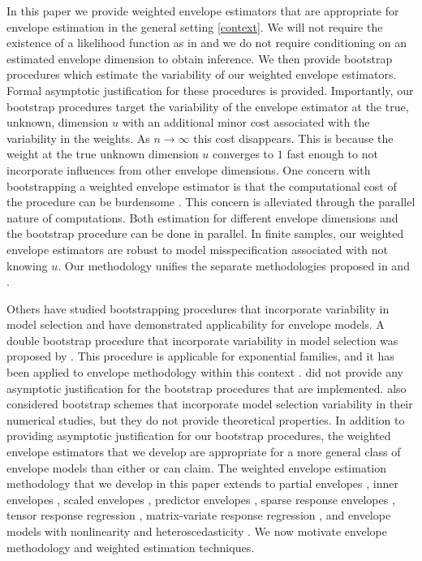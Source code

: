 \documentclass{article}\usepackage[]{graphicx}\usepackage[]{color}
\begin{document}
In this paper we provide weighted envelope estimators that are appropriate for envelope estimation in the general setting \eqref{context}. We will not require the existence of a likelihood function as in \cite{eck2017weighted} and we do not require conditioning on an estimated envelope dimension to obtain inference. We then provide bootstrap procedures which estimate the variability of our weighted envelope estimators. Formal asymptotic justification for these procedures is provided. Importantly, our bootstrap procedures target the variability of the envelope estimator at the true, unknown, dimension $u$ with an additional minor cost associated with the variability in the weights. As $n\to\infty$ this cost disappears. This is because the weight at the true unknown dimension $u$ converges to $1$ fast enough to not incorporate influences from other envelope dimensions. One concern with bootstrapping a weighted envelope estimator is that the computational cost of the procedure can be burdensome \citep{yau2019hypothesis}. This concern is alleviated through the parallel nature of computations. Both estimation for different envelope dimensions and the bootstrap procedure can be done in parallel. 
In finite samples, our weighted envelope estimators are robust to model misspecification associated with not knowing $u$. Our methodology unifies the separate methodologies proposed in \cite{eck2017weighted} and \cite{zhangmai}.


Others have studied bootstrapping procedures that incorporate variability in model selection and have demonstrated applicability for envelope models. A double bootstrap procedure that incorporate variability in model selection was proposed by \citet{efron}. This procedure is applicable for exponential families, and it has been applied to envelope methodology within this context \citep{eck2020aster, eck2018supporting}. \citet{eck2020aster} did not provide any asymptotic justification for the bootstrap procedures that are implemented. \cite{zhangmai} also considered bootstrap schemes that incorporate model selection variability in their numerical studies, but they do not provide theoretical properties. 
In addition to providing asymptotic justification for our bootstrap procedures, the weighted envelope estimators that we develop are appropriate for a more general class of envelope models than either \citet{efron} or \citet{eck2020aster} can claim. The weighted envelope estimation methodology that we develop in this paper extends to partial envelopes \citep{su}, inner envelopes \citep{su-inner}, scaled envelopes \citep{cook-scale}, predictor envelopes \citep{cook-scale-pls}, sparse response envelopes \citep{su2016sparse}, tensor response regression \citep{li2017parsimonious}, matrix-variate response regression \citep{ding2018matrix, ding2018matrixsupplement}, and envelope models with nonlinearity and heteroscedasticity \citep{zhang2020envelopes}. We now motivate envelope methodology and weighted estimation techniques. 
\end{document}
